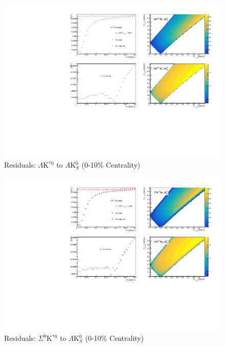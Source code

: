 \documentclass[../AnalysisNoteJBuxton.tex]{subfiles}
\begin{document}
\begin{figure}[h]
  \centering
  \includegraphics[width=\textwidth]{9_AdditionalFigures/Figures/Residuals/LamK0/Residuals_LamK0_0010_LamKSt0ToLamK0_MomResCrctn_NonFlatBgdCrctn_SingleLamParam_10Res_PrimMaxDecay4fm_UsingXiDataAndCoulombOnly.pdf}
  \caption[Residuals: $\Lambda$K$^{*0}$ to $\Lambda$K$^{0}_{S}$ (0-10\% Centrality)]{Residuals: $\Lambda$K$^{*0}$ to $\Lambda$K$^{0}_{S}$ (0-10\% Centrality)}
  \label{fig:Res_LamK0_0010_LamKSt0}
\end{figure}


\begin{figure}[h]
  \centering
  \includegraphics[width=\textwidth]{9_AdditionalFigures/Figures/Residuals/LamK0/Residuals_LamK0_0010_Sig0KSt0ToLamK0_MomResCrctn_NonFlatBgdCrctn_SingleLamParam_10Res_PrimMaxDecay4fm_UsingXiDataAndCoulombOnly.pdf}
  \caption[Residuals: $\Sigma^{0}$K$^{*0}$ to $\Lambda$K$^{0}_{S}$ (0-10\% Centrality)]{Residuals: $\Sigma^{0}$K$^{*0}$ to $\Lambda$K$^{0}_{S}$ (0-10\% Centrality)}
  \label{fig:Res_LamK0_0010_Sig0KSt0}
\end{figure}
\end{document}

